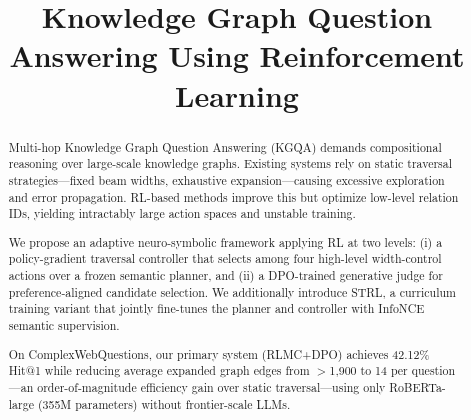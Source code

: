 \documentclass[10pt,conference]{IEEEtran}
\begin{document}

\title{Knowledge Graph Question Answering Using Reinforcement Learning}

\author{
\and
{}
}

\maketitle


\begin{abstract}


Multi-hop Knowledge Graph Question Answering (KGQA) demands compositional reasoning over large-scale knowledge graphs. Existing systems rely on static traversal strategies—fixed beam widths, exhaustive expansion—causing excessive exploration and error propagation. RL-based methods improve this but optimize low-level relation IDs, yielding intractably large action spaces and unstable training.

We propose an adaptive neuro-symbolic framework applying RL at two levels: (i) a policy-gradient traversal controller that selects among four high-level width-control actions over a frozen semantic planner, and (ii) a DPO-trained generative judge for preference-aligned candidate selection. We additionally introduce STRL, a curriculum training variant that jointly fine-tunes the planner and controller with InfoNCE semantic supervision.

On ComplexWebQuestions, our primary system (RLMC+DPO) achieves 42.12\% Hit@1 while reducing average expanded graph edges from $>$1,900 to 14 per question—an order-of-magnitude efficiency gain over static traversal—using only RoBERTa-large (355M parameters) without frontier-scale LLMs.

\end{abstract}
\end{document}
